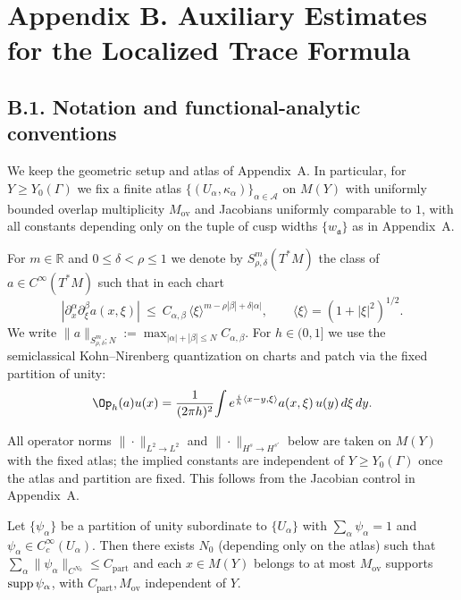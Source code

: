 \section*{Appendix B. Auxiliary Estimates for the Localized Trace Formula}

\subsection*{B.1. Notation and functional-analytic conventions}

\noindent
We keep the geometric setup and atlas of Appendix~A. In particular, for $Y\ge Y_0(\Gamma)$
we fix a finite atlas $\{(U_\alpha,\kappa_\alpha)\}_{\alpha\in\mathcal A}$ on $M(Y)$
with uniformly bounded overlap multiplicity $M_{\mathrm{ov}}$ and Jacobians uniformly
comparable to $1$, with all constants depending only on the tuple of cusp widths
$\{w_{\mathfrak a}\}$ as in Appendix~A.

\begin{definition}\label{def:B.1-symbols}
For $m\in\mathbb R$ and $0\le\delta<\rho\le 1$ we denote by $S^m_{\rho,\delta}(T^*M)$
the class of $a\in C^\infty(T^*M)$ such that in each chart
\[
|\partial_x^\alpha\partial_\xi^\beta a(x,\xi)|\ \le\ C_{\alpha,\beta}\,\langle\xi\rangle^{m-\rho|\beta|+\delta|\alpha|},\qquad
\langle\xi\rangle=(1+|\xi|^2)^{1/2}.
\]
We write $\|a\|_{S^m_{\rho,\delta};N}:=\max_{|\alpha|+|\beta|\le N}C_{\alpha,\beta}$.
For $h\in(0,1]$ we use the semiclassical Kohn–Nirenberg quantization on charts and patch
via the fixed partition of unity:
\[
\Op_h(a)u(x)=\frac{1}{(2\pi h)^2}\!\int e^{\frac{i}{h}\langle x-y,\xi\rangle}a(x,\xi)\,u(y)\,d\xi\,dy.
\]
\end{definition}

\begin{remark}\label{rmk:B.1-uniformity}
All operator norms $\|\cdot\|_{L^2\to L^2}$ and $\|\cdot\|_{H^s\to H^{s'}}$ below are taken on
$M(Y)$ with the fixed atlas; the implied constants are independent of $Y\ge Y_0(\Gamma)$
once the atlas and partition are fixed. This follows from the Jacobian control in Appendix~A.
\end{remark}

\begin{lemma}\label{lem:B.1-overlap}
Let $\{\psi_\alpha\}$ be a partition of unity subordinate to $\{U_\alpha\}$ with
$\sum_\alpha \psi_\alpha=1$ and $\psi_\alpha\in C_c^\infty(U_\alpha)$. Then there exists
$N_0$ (depending only on the atlas) such that
$\sum_\alpha \|\psi_\alpha\|_{C^{N_0}}\le C_{\mathrm{part}}$ and each $x\in M(Y)$
belongs to at most $M_{\mathrm{ov}}$ supports $\operatorname{supp}\psi_\alpha$, with $C_{\mathrm{part}},
M_{\mathrm{ov}}$ independent of $Y$.
\end{lemma}

